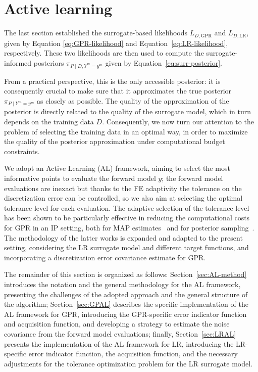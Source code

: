 \section{Active learning}\label{sec:AL}
The last section established the surrogate-based likelihoods $L_{D, \text{GPR}}$ and $L_{D, \text{LR}}$, given by Equation \eqref{eq:GPR-likelihood} and Equation~\eqref{eq:LR-likelihood}, respectively.
These two likelihoods are then used to compute the surrogate-informed posteriors $\pi_{P\mid D, Y^m = y^m} $ given by Equation~\eqref{eq:surr-posterior}.

From a practical perspective, this is the only accessible posterior: it is consequently crucial to make sure that it approximates the true posterior $\pi_{P\mid Y^m = y^m}$ as closely as possible.
The quality of the approximation of the posterior is directly related to the quality of the surrogate model, which in turn depends on the training data $D$.
Consequently, we now turn our attention to the problem of selecting the training data in an optimal way, in order to maximize the quality of the posterior approximation under computational budget constraints.

We adopt an Active Learning (AL) framework, aiming to select the most informative points to evaluate the forward model $y$; the forward model evaluations are inexact but thanks to the FE adaptivity the tolerance on the discretization error can be controlled, so we also aim at selecting the optimal tolerance level for each evaluation.
The adaptive selection of the tolerance level has been shown to be particularly effective in reducing the computational costs for GPR in an IP setting, both for MAP estimates~\cite{SemlerWeiser2023,SemlerWeiser2024} and for posterior sampling~\cite{VillaniUngerWeiser2024}.
The methodology of the latter works is expanded and adapted to the present setting, considering the LR surrogate model and different target functions, and incorporating a discretization error covariance estimate for GPR. \medbreak

The remainder of this section is organized as follows: Section~\ref{sec:AL-method} introduces the notation and the general methodology for the AL framework, presenting the challenges of the adopted approach and the general structure of the algorithm; Section~\ref{sec:GPAL} describes the specific implementation of the AL framework for GPR, introducing the GPR-specific error indicator function and acquisition function, and developing a strategy to estimate the noise covariance from the forward model evaluations; finally, Section~\ref{sec:LRAL} presents the implementation of the AL framework for LR, introducing the LR-specific error indicator function, the acquisition function, and the necessary adjustments for the tolerance optimization problem for the LR surrogate model.

